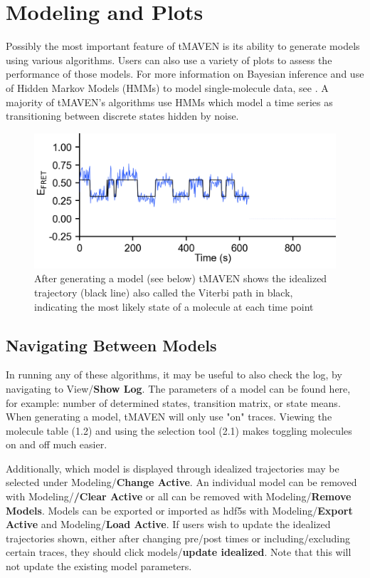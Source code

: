 \documentclass[11pt,a5paper,footinclude=true,headinclude=true]{scrbook} %
\begin{document}
\chapter{Modeling and Plots}
Possibly the most important feature of tMAVEN is its ability to generate models using various algorithms. Users can also use a variety of plots to assess the performance of those models. For more information on Bayesian inference and use of Hidden Markov Models (HMMs) to model single-molecule data, see \cite{annurev-biophys}. A majority of tMAVEN's algorithms use HMMs which model a time series as transitioning between discrete states hidden by noise. 


\begin{figure}[h]
\centering
\includegraphics[scale=0.45]{mlHMMex.png}
\caption{After generating a model (see below) tMAVEN shows the idealized trajectory (black line) also called the Viterbi path in black, indicating the most likely state of a molecule at each time point}
\end{figure}


\section{Navigating Between Models} In running any of these algorithms, it may be useful to also check the log, by navigating to View/\textbf{Show Log}. The parameters of a model can be found here, for example: number of determined states, transition matrix, or state means. When generating a model, tMAVEN will only use "on" traces. Viewing the molecule table (1.2) and using the selection tool (2.1) makes toggling molecules on and off much easier. 

Additionally, which model is displayed through idealized trajectories may be selected under Modeling/\textbf{Change Active}. An individual model can be removed with Modeling/\textbf{/Clear Active} or all can be removed with Modeling/\textbf{Remove Models}. Models can be exported or imported as hdf5s with Modeling/\textbf{Export Active} and Modeling/\textbf{Load Active}. If users wish to update the idealized trajectories shown, either after changing pre/post times or including/excluding certain traces, they should click models/\textbf{update idealized}. Note that this will not update the existing model parameters.  
\end{document}
